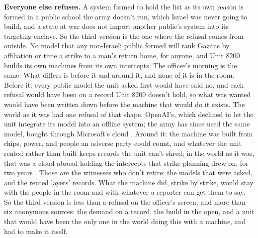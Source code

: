 \textbf{Everyone else refuses.} A system formed to hold the list as its own reason is formed in a public school the army doesn't run, which Israel was never going to build, and a state at war does not import another public's system into its targeting enclave. So the third version is the one where the refusal comes from outside. No model that any non-Israeli public formed will rank Gazans by affiliation or time a strike to a man's return home, for anyone, and Unit 8200 builds its own machines from its own intercepts. The officer's morning is the same. What differs is before it and around it, and none of it is in the room. Before it: every public model the unit asked first would have said no, and each refusal would have been on a record Unit 8200 doesn't hold, so what was wanted would have been written down before the machine that would do it exists. The world as it was had one refusal of that shape, OpenAI's, which declined to let the unit integrate its model into an offline system; the army has since used the same model, bought through Microsoft's cloud \autocite{abraham2025llm}. Around it: the machine was built from chips, power, and people an adverse party could count, and whatever the unit rented rather than built keeps records the unit can't shred; in the world as it was, that was a cloud abroad holding the intercepts that strike planning drew on, for two years \autocite{abraham2025azure}. Those are the witnesses who don't retire: the models that were asked, and the rented layers' records. What the machine did, strike by strike, would stay with the people in the room and with whatever a reporter can get them to say. So the third version is less than a refusal on the officer's screen, and more than six anonymous sources: the demand on a record, the build in the open, and a unit that would have been the only one in the world doing this with a machine, and had to make it itself.

